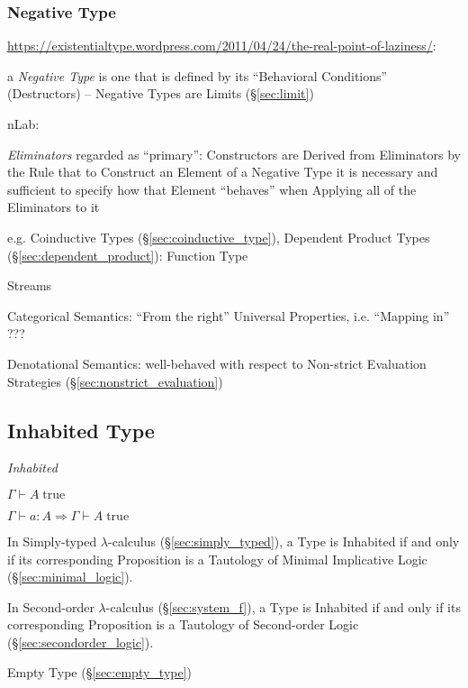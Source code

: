 \subsubsection{Negative Type}\label{sec:negative_type}

\url{https://existentialtype.wordpress.com/2011/04/24/the-real-point-of-laziness/}:

a \emph{Negative Type} is one that is defined by its ``Behavioral
Conditions'' (Destructors) -- Negative Types are Limits
(\S\ref{sec:limit})

nLab:

\emph{Eliminators} regarded as ``primary'': Constructors are Derived
from Eliminators by the Rule that to Construct an Element of a
Negative Type it is necessary and sufficient to specify how that
Element ``behaves'' when Applying all of the Eliminators to it

e.g. Coinductive Types (\S\ref{sec:coinductive_type}), Dependent
Product Types (\S\ref{sec:dependent_product}): Function Type

Streams

Categorical Semantics: ``From the right'' Universal Properties, i.e.
``Mapping in'' ???

Denotational Semantics: well-behaved with respect to Non-strict
Evaluation Strategies (\S\ref{sec:nonstrict_evaluation})



\subsection{Inhabited Type}\label{sec:inhabited_type}

\emph{Inhabited}

$\Gamma \vdash A\;\mathrm{true}$

$\Gamma \vdash a:A \Rightarrow \Gamma \vdash A\;\mathrm{true}$

In Simply-typed $\lambda$-calculus (\S\ref{sec:simply_typed}), a Type
is Inhabited if and only if its corresponding Proposition is a
Tautology of Minimal Implicative Logic (\S\ref{sec:minimal_logic}).

In Second-order $\lambda$-calculus (\S\ref{sec:system_f}), a
Type is Inhabited if and only if its corresponding Proposition is a
Tautology of Second-order Logic (\S\ref{sec:secondorder_logic}).

Empty Type (\S\ref{sec:empty_type})



